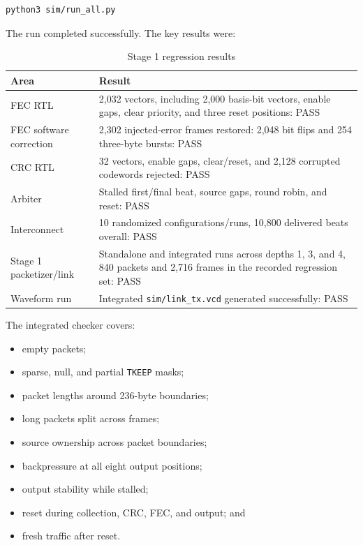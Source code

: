 \documentclass[11pt,a4paper]{article}
\newcommand{\code}[1]{\texttt{#1}}
\begin{document}
\begin{verbatim}
python3 sim/run_all.py
\end{verbatim}

The run completed successfully. The key results were:

\begin{table}[H]
\centering
\caption{Stage 1 regression results}
\begin{tabular}{>{\raggedright\arraybackslash}p{} p{}}
\toprule
\textbf{Area} & \textbf{Result} \\
\midrule
FEC RTL & 2,032 vectors, including 2,000 basis-bit vectors, enable gaps, clear priority, and three reset positions: PASS \\
FEC software correction & 2,302 injected-error frames restored: 2,048 bit flips and 254 three-byte bursts: PASS \\
CRC RTL & 32 vectors, enable gaps, clear/reset, and 2,128 corrupted codewords rejected: PASS \\
Arbiter & Stalled first/final beat, source gaps, round robin, and reset: PASS \\
Interconnect & 10 randomized configurations/runs, 10,800 delivered beats overall: PASS \\
Stage 1 packetizer/link & Standalone and integrated runs across depths 1, 3, and 4, 840 packets and 2,716 frames in the recorded regression set: PASS \\
Waveform run & Integrated \code{sim/link\_tx.vcd} generated successfully: PASS \\
\bottomrule
\end{tabular}
\end{table}

The integrated checker covers:

\begin{itemize}[leftmargin=*]
    \item empty packets;
    \item sparse, null, and partial \code{TKEEP} masks;
    \item packet lengths around 236-byte boundaries;
    \item long packets split across frames;
    \item source ownership across packet boundaries;
    \item backpressure at all eight output positions;
    \item output stability while stalled;
    \item reset during collection, CRC, FEC, and output; and
    \item fresh traffic after reset.
\end{itemize}
\end{document}
